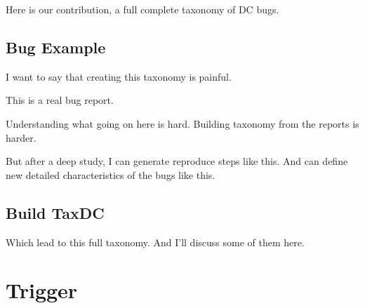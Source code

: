 Here is our contribution, a full complete taxonomy of DC bugs. 

\subsection{Bug Example}

I want to say that creating this taxonomy is painful. 

This is a real bug report.

Understanding what going on here is hard. Building taxonomy from the
reports is harder. 

But after a deep study, I can generate reproduce steps like this. And can define
new detailed characteristics of the bugs like this. 

%
%


\subsection{Build TaxDC}

Which lead to this full taxonomy.  And I'll discuss some of them here.

\section{Trigger}

